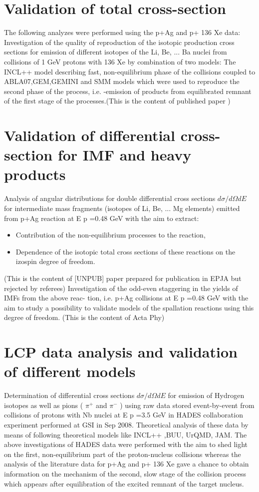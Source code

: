\section{Validation of total cross-section}
	The following analyzes were performed using the p+Ag and p+ 136 Xe
	data:
	Investigation of the quality of reproduction of the isotopic production cross sections for emission of different isotopes of the Li, Be, ... Ba nuclei from collisions of 1 GeV protons with 136 Xe by combination of two models: The INCL++ model describing fast, non-equilibrium phase of the collisions coupled to ABLA07,GEM,GEMINI and SMM models which were used to reproduce the second phase of the process, i.e. -emission of products from equilibrated remnant of the first stage of the processes.(This is the content of published paper \cite{singh2018predictive})
	\section{Validation of differential cross-section for IMF and heavy products}
	Analysis of angular distributions for double differential cross sections $d\sigma/d\Omega dE$ for intermediate mass fragments (isotopes of Li, Be, ... Mg elements) emitted from p+Ag reaction at E p =0.48 GeV with the aim to extract:
	\begin{itemize}
		\item Contribution of the non-equilibrium processes to the reaction, 
		\item Dependence of the isotopic total cross sections of these reactions on the izospin degree of freedom.
	\end{itemize}
	
	(This is the content of [UNPUB] paper prepared for publication in EPJA but
	rejected by referees)
	Investigation of the odd-even staggering in the yields of IMFs from the above reac-
	tion, i.e. p+Ag collisions at E p =0.48 GeV with the aim to study a possibility to
	validate models of the spallation reactions using this degree of freedom. (This is
	the content of Acta Phy)
	\section{LCP data analysis and validation of different models}
	Determination of differential cross sections $d\sigma/d\Omega dE$ for emission of Hydrogen isotopes as well as pions ( $\pi^+$ and $\pi^-$ ) using raw data stored event-by-event from collisions of protons with Nb nuclei at E p =3.5 GeV in HADES collaboration experiment performed at GSI in Sep 2008. Theoretical analysis of these data by means of following theoretical models like INCL++ ,BUU, UrQMD, JAM.
	The above investigations of HADES data were performed with the aim to shed light on the first, non-equilibrium part of the proton-nucleus collisions whereas the analysis of the literature data for p+Ag and p+ 136 Xe gave a chance to obtain information on
	the mechanism of the second, slow stage of the collision process which appears after equilibration of the excited remnant of the target nucleus.